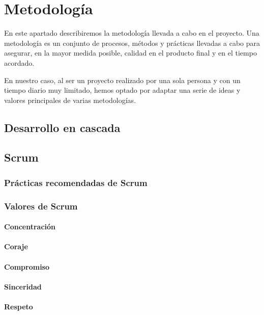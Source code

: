 \chapter{Metodología}

En este apartado describiremos la metodología llevada a cabo en el proyecto. Una metodología es un conjunto de procesos, métodos y prácticas llevadas a cabo para asegurar, en la mayor medida posible, calidad en el producto final y en el tiempo acordado.

En nuestro caso, al ser un proyecto realizado por una sola persona y con un tiempo diario muy limitado, hemos optado por adaptar una serie de ideas y valores principales de varias metodologías.

\section{Desarrollo en cascada}

\section{Scrum}

\subsection{Prácticas recomendadas de Scrum}

\subsection{Valores de Scrum}

\subsubsection{Concentración}


\subsubsection{Coraje}


\subsubsection{Compromiso}


\subsubsection{Sinceridad}


\subsubsection{Respeto}

